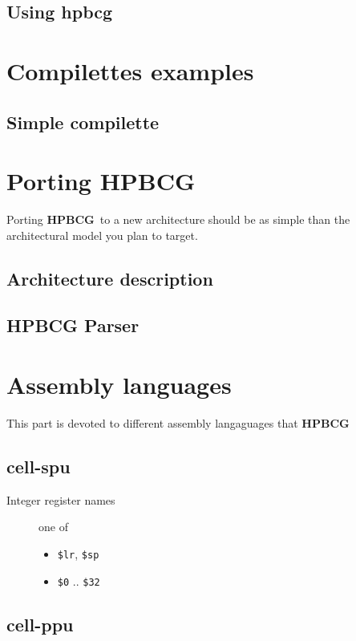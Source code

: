 \documentclass{article}
\newcommand{\hpbcg}{\textbf{HPBCG}\ }
\begin{document}
\subsection{Using hpbcg}

\section{Compilettes examples}

\subsection{Simple compilette}


\section{Porting \hpbcg}

Porting \hpbcg to a new architecture should be as simple than the
architectural model you plan to target.

\subsection{Architecture description}

\subsection{HPBCG Parser}

\section{Assembly languages}

This part is devoted to different assembly langaguages that \hpbcg

\subsection{cell-spu}

\begin{description}
\item[Integer register names] one of
  \begin{itemize}
  \item \verb|$lr|, \verb|$sp|
  \item \verb|$0| .. \verb|$32|
  \end{itemize}
\end{description}

\subsection{cell-ppu}
\end{document}
